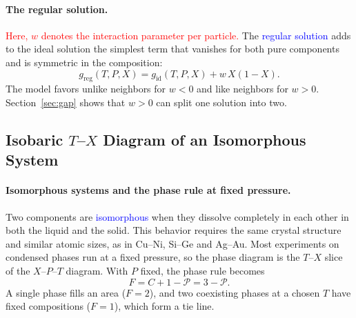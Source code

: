 \paragraph{The regular solution.}
\textcolor{red}{Here, $w$ denotes the interaction parameter per particle.}
The \textcolor{blue}{regular solution} adds to the ideal solution the
simplest term that vanishes for both pure components and is symmetric in
the composition:
\begin{equation}
    \boxed{g_{\text{reg}}(T,P,X)=g_{\text{id}}(T,P,X)+w\,X(1-X).}
\end{equation}
The model favors unlike neighbors for $w<0$ and like neighbors for $w>0$.
Section~\ref{sec:gap} shows that $w>0$ can split one solution into two.

\subsection{Isobaric $T$--$X$ Diagram of an Isomorphous System}
\label{sec:lens}

\paragraph{Isomorphous systems and the phase rule at fixed pressure.}
Two components are \textcolor{blue}{isomorphous} when they dissolve
completely in each other in both the liquid and the solid. This behavior
requires the same crystal structure and similar atomic sizes, as in Cu--Ni,
Si--Ge and Ag--Au. Most experiments on condensed phases run at a fixed
pressure, so the phase diagram is the $T$--$X$ slice of the $X$--$P$--$T$
diagram. With $P$ fixed, the phase rule becomes
\begin{equation}
    \boxed{F=C+1-\mathcal{P}=3-\mathcal{P}.}
\end{equation}
A single phase fills an area ($F=2$), and two coexisting phases at a chosen
$T$ have fixed compositions ($F=1$), which form a tie line.

